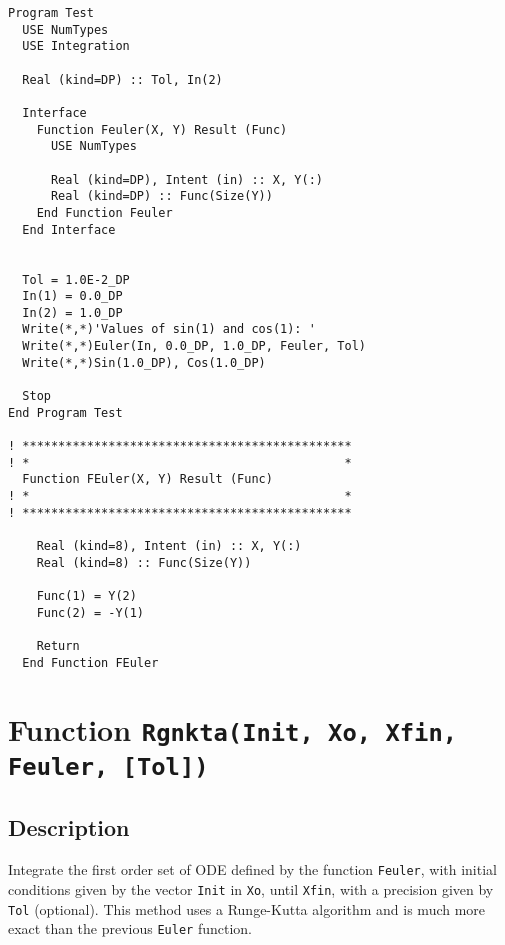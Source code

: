 \begin{lstlisting}[emph=Euler,
                   emphstyle=\color{blue},
                   frame=trBL,
                   caption=Integrating differential equations with Euler.,
                   label=euler]
Program Test
  USE NumTypes
  USE Integration

  Real (kind=DP) :: Tol, In(2)

  Interface
    Function Feuler(X, Y) Result (Func)
      USE NumTypes

      Real (kind=DP), Intent (in) :: X, Y(:)
      Real (kind=DP) :: Func(Size(Y))
    End Function Feuler
  End Interface


  Tol = 1.0E-2_DP
  In(1) = 0.0_DP
  In(2) = 1.0_DP
  Write(*,*)'Values of sin(1) and cos(1): '
  Write(*,*)Euler(In, 0.0_DP, 1.0_DP, Feuler, Tol)
  Write(*,*)Sin(1.0_DP), Cos(1.0_DP)

  Stop
End Program Test

! **********************************************  
! *                                            *
  Function FEuler(X, Y) Result (Func)
! *                                            *
! **********************************************

    Real (kind=8), Intent (in) :: X, Y(:)
    Real (kind=8) :: Func(Size(Y))

    Func(1) = Y(2)
    Func(2) = -Y(1)
    
    Return
  End Function FEuler
\end{lstlisting}

\section{Function \texttt{Rgnkta(Init, Xo, Xfin, Feuler, [Tol])}}

\subsection{Description}

Integrate the first order set of ODE defined by the function
\texttt{Feuler}, with initial conditions given by the vector
\texttt{Init} in \texttt{Xo}, until \texttt{Xfin}, with a precision
given by \texttt{Tol} (optional). This method uses a Runge-Kutta
algorithm and is much more exact than the previous \texttt{Euler}
function. 

